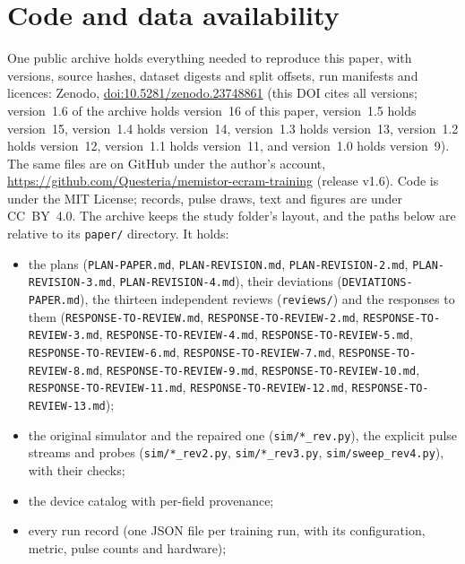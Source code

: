 








\section{Code and data availability}\label{sec:availability}
\begin{sloppypar}
One public archive holds everything needed to reproduce this paper, with versions, source hashes, dataset digests and split
offsets, run manifests and licences: Zenodo, \href{https://doi.org/10.5281/zenodo.23748861}{doi:10.5281/zenodo.23748861}
(this DOI cites all versions; version~1.6 of the archive holds version~16 of this paper, version~1.5 holds version~15,
version~1.4 holds version~14,
version~1.3 holds version~13,
version~1.2 holds version~12, version~1.1 holds version~11, and version~1.0 holds version~9). The same files are on GitHub under
the author's account, \url{https://github.com/Questeria/memistor-ecram-training} (release v1.6). Code is under the MIT License; records, pulse draws, text and
figures are under CC~BY~4.0. The archive keeps the study folder's layout, and the paths below are relative to its
\texttt{paper/} directory. It holds:
\begin{itemize}
\item the plans (\texttt{PLAN-PAPER.md}, \texttt{PLAN-REVISION.md}, \texttt{PLAN-REVISION-2.md},
      \texttt{PLAN-REVISION-3.md}, \texttt{PLAN-REVISION-4.md}), their deviations (\texttt{DEVIATIONS-PAPER.md}), the thirteen independent reviews
      (\texttt{reviews/}) and the responses to them (\texttt{RESPONSE-TO-REVIEW.md}, \texttt{RESPONSE-TO-REVIEW-2.md},
      \texttt{RESPONSE-TO-REVIEW-3.md}, \texttt{RESPONSE-TO-REVIEW-4.md}, \texttt{RESPONSE-TO-REVIEW-5.md}, \texttt{RESPONSE-TO-REVIEW-6.md}, \texttt{RESPONSE-TO-REVIEW-7.md}, \texttt{RESPONSE-TO-REVIEW-8.md}, \texttt{RESPONSE-TO-REVIEW-9.md}, \texttt{RESPONSE-TO-REVIEW-10.md}, \texttt{RESPONSE-TO-REVIEW-11.md}, \texttt{RESPONSE-TO-REVIEW-12.md}, \texttt{RESPONSE-TO-REVIEW-13.md});
\item the original simulator and the repaired one (\texttt{sim/*\_rev.py}), the explicit pulse streams and probes
      (\texttt{sim/*\_rev2.py}, \texttt{sim/*\_rev3.py}, \texttt{sim/sweep\_rev4.py}), with their checks;
\item the device catalog with per-field provenance;
\item every run record (one JSON file per training run, with its configuration, metric, pulse counts and hardware);

\end{itemize}
\end{sloppypar}
